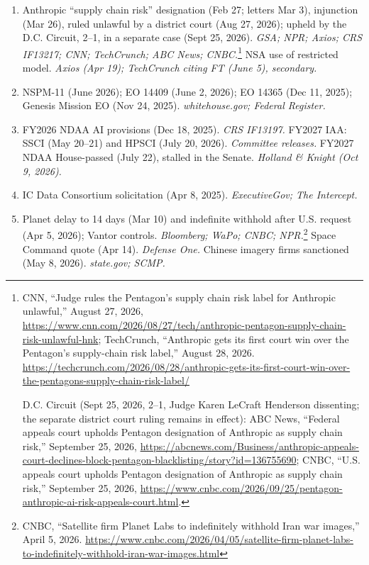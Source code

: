 \documentclass[11pt,letterpaper]{article}
\begin{document}
{\begin{enumerate}[itemsep=1pt]
  \item Anthropic ``supply chain risk'' designation (Feb 27; letters Mar 3), injunction (Mar 26), ruled unlawful by a district court (Aug 27, 2026); upheld by the D.C. Circuit, 2--1, in a separate case (Sept 25, 2026). \textit{GSA; NPR; Axios; CRS IF13217; CNN; TechCrunch; ABC News; CNBC.}\footnote{CNN, ``Judge rules the Pentagon's supply chain risk label for Anthropic unlawful,'' August 27, 2026, \url{https://www.cnn.com/2026/08/27/tech/anthropic-pentagon-supply-chain-risk-unlawful-hnk}; TechCrunch, ``Anthropic gets its first court win over the Pentagon's supply-chain risk label,'' August 28, 2026. \url{https://techcrunch.com/2026/08/28/anthropic-gets-its-first-court-win-over-the-pentagons-supply-chain-risk-label/}\par D.C. Circuit (Sept 25, 2026, 2--1, Judge Karen LeCraft Henderson dissenting; the separate district court ruling remains in effect): ABC News, ``Federal appeals court upholds Pentagon designation of Anthropic as supply chain risk,'' September 25, 2026, \url{https://abcnews.com/Business/anthropic-appeals-court-declines-block-pentagon-blacklisting/story?id=136755690}; CNBC, ``U.S. appeals court upholds Pentagon designation of Anthropic as supply chain risk,'' September 25, 2026, \url{https://www.cnbc.com/2026/09/25/pentagon-anthropic-ai-risk-appeals-court.html}.} NSA use of restricted model. \textit{Axios (Apr 19); TechCrunch citing FT (June 5), secondary.}
  \item NSPM-11 (June 2026); EO 14409 (June 2, 2026); EO 14365 (Dec 11, 2025); Genesis Mission EO (Nov 24, 2025). \textit{whitehouse.gov; Federal Register.}
  \item FY2026 NDAA AI provisions (Dec 18, 2025). \textit{CRS IF13197.} FY2027 IAA: SSCI (May 20--21) and HPSCI (July 20, 2026). \textit{Committee releases.} FY2027 NDAA House-passed (July 22), stalled in the Senate. \textit{Holland \& Knight (Oct 9, 2026).}
  \item IC Data Consortium solicitation (Apr 8, 2025). \textit{ExecutiveGov; The Intercept.}
  \item Planet delay to 14 days (Mar 10) and indefinite withhold after U.S. request (Apr 5, 2026); Vantor controls. \textit{Bloomberg; WaPo; CNBC; NPR.}\footnote{CNBC, ``Satellite firm Planet Labs to indefinitely withhold Iran war images,'' April 5, 2026. \url{https://www.cnbc.com/2026/04/05/satellite-firm-planet-labs-to-indefinitely-withhold-iran-war-images.html}} Space Command quote (Apr 14). \textit{Defense One.} Chinese imagery firms sanctioned (May 8, 2026). \textit{state.gov; SCMP.}

\end{enumerate}}
\end{document}
